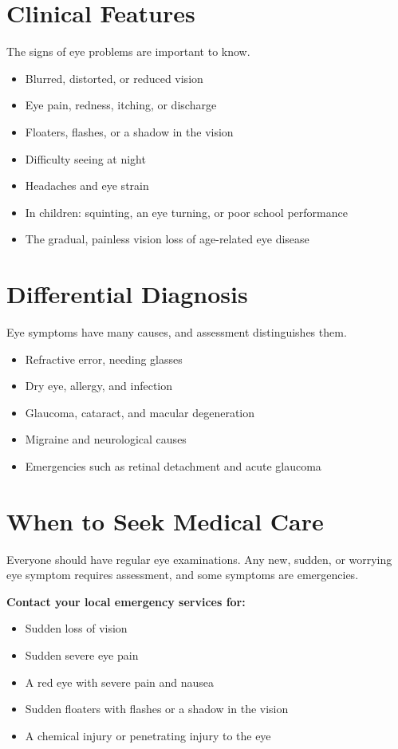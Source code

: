 \section*{Clinical Features}
The signs of eye problems are important to know.
\begin{itemize}
    \item Blurred, distorted, or reduced vision
    \item Eye pain, redness, itching, or discharge
    \item Floaters, flashes, or a shadow in the vision
    \item Difficulty seeing at night
    \item Headaches and eye strain
    \item In children: squinting, an eye turning, or poor school performance
    \item The gradual, painless vision loss of age-related eye disease
\end{itemize}

\section*{Differential Diagnosis}
Eye symptoms have many causes, and assessment distinguishes them.
\begin{itemize}
    \item Refractive error, needing glasses
    \item Dry eye, allergy, and infection
    \item Glaucoma, cataract, and macular degeneration
    \item Migraine and neurological causes
    \item Emergencies such as retinal detachment and acute glaucoma
\end{itemize}

\section*{When to Seek Medical Care}
Everyone should have regular eye examinations. Any new, sudden, or worrying eye symptom requires assessment, and some symptoms are emergencies.

\textbf{Contact your local emergency services for:}
\begin{itemize}
    \item Sudden loss of vision
    \item Sudden severe eye pain
    \item A red eye with severe pain and nausea
    \item Sudden floaters with flashes or a shadow in the vision
    \item A chemical injury or penetrating injury to the eye
\end{itemize}

